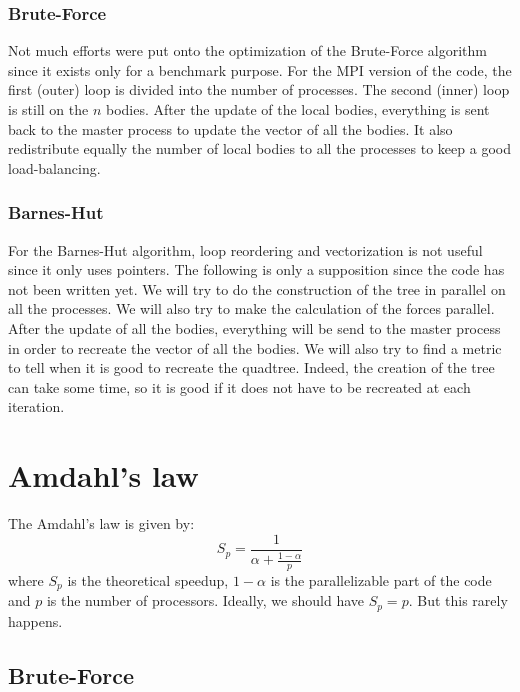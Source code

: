 \documentclass[11pt,a4paper]{article}
\begin{document}
\subsubsection{Brute-Force}

Not much efforts were put onto the optimization of the Brute-Force algorithm since it exists only for a benchmark purpose. For the MPI version of the code, the first (outer) loop is divided into the number of processes. The second (inner) loop is still on the $n$ bodies. After the update of the local bodies, everything is sent back to the master process to update the vector of all the bodies. It also redistribute equally the number of local bodies to all the processes to keep a good load-balancing.

\subsubsection{Barnes-Hut}

For the Barnes-Hut algorithm, loop reordering and vectorization is not useful since it only uses pointers. The following is only a supposition since the code has not been written yet. We will try to do the construction of the tree in parallel on all the processes. We will also try to make the calculation of the forces parallel. After the update of all the bodies, everything will be send to the master process in order to recreate the vector of all the bodies. We will also try to find a metric to tell when it is good to recreate the quadtree. Indeed, the creation of the tree can take some time, so it is good if it does not have to be recreated at each iteration.

\section{Amdahl's law}

The Amdahl's law is given by:
\begin{equation}
S_{p} = \frac{1}{\alpha + \frac{1-\alpha}{p}}
\end{equation}
where $S_{p}$ is the theoretical speedup, $1-\alpha$ is the parallelizable part of the code and $p$ is the number of processors. Ideally, we should have $S_p = p$. But this rarely happens.

\subsection{Brute-Force}
\end{document}

